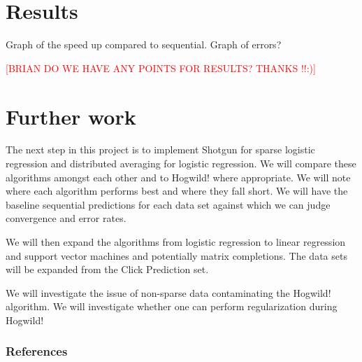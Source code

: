 \documentclass{article} %
\begin{document}
\section{Results}
Graph of the speed up compared to sequential.
Graph of errors?

\textcolor{red}{[BRIAN DO WE HAVE ANY POINTS FOR RESULTS? THANKS !!:)]}

\section{Further work}
The next step in this project is to implement Shotgun for sparse logistic regression and distributed averaging for logistic regression. We will compare these algorithms amongst each other and to Hogwild! where appropriate. We will note where each algorithm performs best and where they fall short. We will have the baseline sequential predictions for each data set against which we can judge convergence and error rates.

We will then expand the algorithms from logistic regression to linear regression and support vector machines and potentially matrix completions. The data sets will be expanded from the Click Prediction set.

We will investigate the issue of non-sparse data contaminating the Hogwild! algorithm. We will investigate whether one can perform regularization during Hogwild!

\subsubsection*{References}

\begingroup
\renewcommand{\section}[2]{}%


\endgroup
\end{document}
